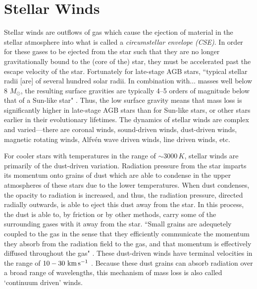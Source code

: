 \documentclass[twocolumn]{aastex63}
\begin{document}
\section{Stellar Winds} \label{sec:winds}

Stellar winds are outflows of gas which cause the ejection of material in the stellar atmosphere into what is called a \textit{circumstellar envelope (CSE)}. In order for these gases to be ejected from the star such that they are no longer gravitationally bound to the (core of the) star, they must be accelerated past the escape velocity of the star. Fortunately for late-stage AGB stars, ``typical stellar radii [are] of several hundred solar radii. In combination with$\ldots$ masses well below 8 $M_\odot$, the resulting surface gravities are typically 4–5 orders of magnitude below that of a Sun-like star" \citep{hofner}. Thus, the low surface gravity means that mass loss is significantly higher in late-stage AGB stars than for Sun-like stars, or other stars earlier in their evolutionary lifetimes. The dynamics of stellar winds are complex and varied—there are coronal winds, sound-driven winds, dust-driven winds, magnetic rotating winds, Alfv\'en wave driven winds, line driven winds, etc. \citep{lamers}

For cooler stars with temperatures in the range of $\sim 3000\,K$, stellar winds are primarily of the dust-driven variation. Radiation pressure from the star imparts its momentum onto grains of dust which are able to condense in the upper atmospheres of these stars due to the lower temperatures. When dust condenses, the opacity to radiation is increased, and thus, the radiation pressure, directed radially outwards, is able to eject this dust away from the star. In this process, the dust is able to, by friction or by other methods, carry some of the surrounding gases with it away from the star. ``Small grains are adequetely coupled to the gas in the sense that they efficiently communicate the momentum they absorb from the radiation field to the gas, and that momentum is effectively diffused throughout the gas" \citep{gilman}. These dust-driven winds have terminal velocities in the range of $10-30~{\rm km\,s^{-1}}$ \citep{lamers}. Because these dust grains can absorb radiation over a broad range of wavelengths, this mechanism of mass loss is also called `continuum driven’ winds. 
\end{document}
